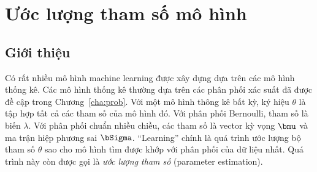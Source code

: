 \chapter{Ước lượng tham số mô hình}

 
 
 
\section{Giới thiệu}
 
 
 
 
 

 
Có rất nhiều mô hình machine learning được xây dựng dựa trên các mô hình thống
kê. Các mô hình thống kê thường dựa trên các phân phối xác suất đã được đề cập
trong Chương~\ref{cha:prob}. Với một mô hình thông kê bất kỳ, ký hiệu $\theta$
là tập hợp tất cả các tham số của mô hình đó. Với phân phối Bernoulli, tham số
là biến $\lambda$. Với phân phối chuẩn nhiều chiều, các tham số là vector kỳ
vọng $\bmu$ và ma trận hiệp phương sai $\bSigma$.  ``Learning'' chính là quá
trình {ước lượng} bộ tham số $\theta$ sao cho mô hình tìm được khớp với phân
phối của dữ liệu nhất. Quá trình này còn được gọi là \textit{ước lượng tham số} (parameter estimation).


